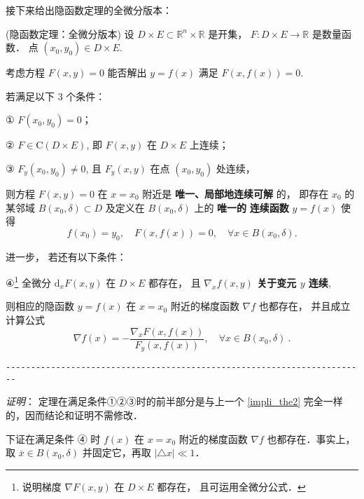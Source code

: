 接下来给出隐函数定理的全微分版本：
 \begin{theorem}{(隐函数定理：全微分版本)}
 设 $D\times E\subset\mathbb{R}^{n}\times\mathbb{R}$ 是开集， $F:D\times E\rightarrow\mathbb{R}$
是数量函数． 点 $(x_{0},y_{0})\in D\times E.$ 

考虑方程 $F(x,y)=0$ 能否解出 $y=f(x)$ 满足 $F(x,f(x))=0.$ 

若满足以下 3 个条件：

① $F(x_{0},y_{0})=0$；

② $F\in\mathrm{C}(D\times E)$, 即 $F(x,y)$ 在 $D\times E$ 上连续； 

③ $F_{y}(x_{0},y_{0})\neq0$, 且 $F_{y}(x,y)$ 在点 $(x_0,y_0)$ 处连续，

则方程 $F(x,y)=0$ 在 $x=x_{0}$ 附近是\textbf{ 唯一、局部地连续可解} 的， 即存在 $x_{0}$
的某邻域 $B(x_{0},\delta)\subset D$ 及定义在 $B(x_{0},\delta)$ 上的 \textbf{唯一的} \textbf{
连续函数} $y=f(x)$ 使得
\[
f(x_{0})=y_{0},\quad F(x,f(x))=0,\quad\forall x\in B(x_{0},\delta).
\]

进一步， 若还有以下条件：

④\footnote{说明梯度 $\nabla F(x,y)$ 在 $D\times E$ 都存在， 且可运用全微分公式．} 全微分 $\mathrm{d}_{x}F(x,y)$ 在 $D\times E$ 都存在， 且 \textbf{$\nabla_x f(x,y)$ 关于变元 $y$ 连续},

则相应的隐函数 $y=f(x)$ 在 $x=x_{0}$ 附近的梯度函数 $\nabla f$ 也都存在， 并且成立计算公式
\[
\nabla f(x)=-{\displaystyle \frac{\nabla_{x}F(x,f(x))}{F_{y}(x,f(x))}},\quad\forall x\in B(x_{0},\delta)~.
\]

\verb|------------------------------------------------------------------------|

\textsl{证明}： 定理在满足条件①②③时的前半部分是与上一个 \autoref{impli_the2} 完全一样的，因而结论和证明不需修改．

下证在满足条件 ④ 时 $f(x)$ 在 $x=x_{0}$ 附近的梯度函数 $\nabla f$ 也都存在．事实上， 取 $\overline{x}\in B(x_{0},\delta)$ 并固定它，再取 $\left|\triangle x\right|\ll1$． %


\end{theorem}
